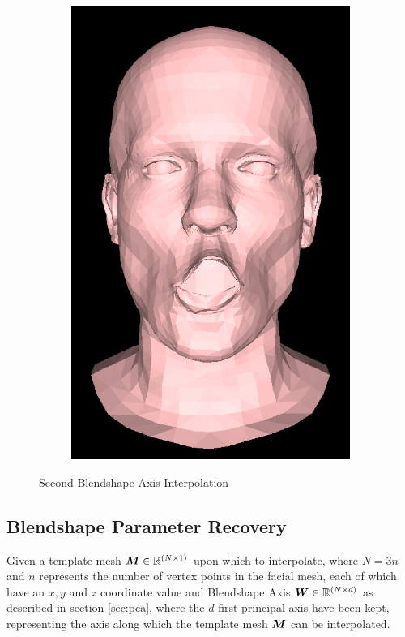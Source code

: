 \begin{figure}[h]
\begin{subfigure}[b]{0.24\textwidth}
        \includegraphics[width=\textwidth]{figures/blendshape_interp/2/00004.png}
    \end{subfigure}
    \caption{Second Blendshape Axis Interpolation}\label{fig:Blendshape_axis_2}
\end{figure}

\subsection{Blendshape Parameter Recovery} \label{sec:blendshape_recovery}
Given a template mesh ${\boldsymbol{{M}}} \in \mathbb{R}^{(N \times 1)}$ upon which to interpolate, where $N = 3n$ and $n$ represents the number of vertex points in the facial mesh, each of which have an $x, y$ and $z$ coordinate value and Blendshape Axis ${\boldsymbol{{W}}} \in \mathbb{R}^{(N \times d)}$ as described in section \ref{sec:pca}, where the $d$ first principal axis have been kept, representing the axis along which the template mesh ${\boldsymbol{{M}}}$ can be interpolated.

